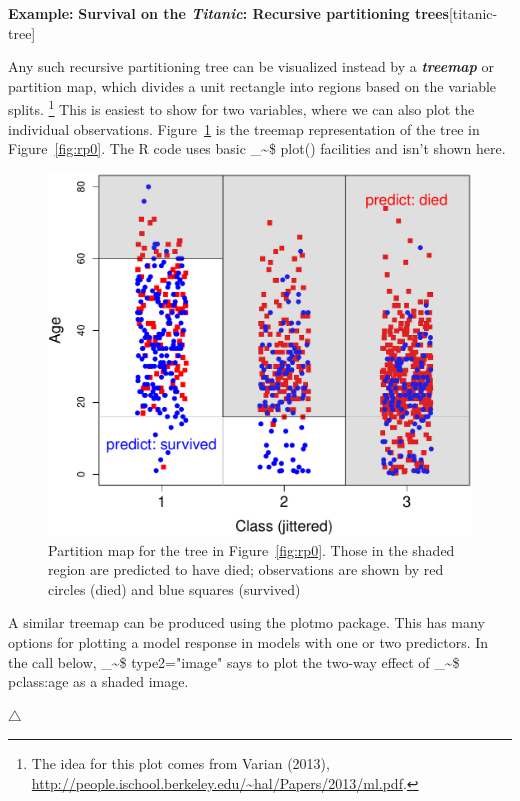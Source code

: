 \documentclass{article}
\makeatletter
\newenvironment{knitrout}{}{} %
\newcommand{\figref}[1]{Figure~\ref{#1}}
\newcommand\code{\bgroup\@makeother\_\@makeother\~\@makeother\$\@codex}
\def\@codex#1{{\normalfont\ttfamily\hyphenchar\font=-1 #1}\egroup}
\newcommand{\func}[1]{\code{#1()}}
\let\proglang=\textsf
\newcommand{\R}{\proglang{R}\xspace}
\newcommand{\pkg}[1]{\textsf{#1}\nocite{R-#1}}
\newcommand{\Rpackage}[1]{\pkg{#1} package}
\newcommand{\glossterm}[1]{\textit{\textbf{#1}}}
\newenvironment{Example}[2][unnamed-example]%
  {\medskip\noindent\textbf{\textsf{Example:}}
   \textbf{#2}\hfill [#1]\par\smallskip
  }
  {\hfill $\triangle$}
\makeatother
\begin{document}
\begin{Example}[titanic-tree]{Survival on the \emph{Titanic}: Recursive partitioning trees}
Any such recursive partitioning tree can be visualized instead by a
\glossterm{treemap} or partition map, which divides a unit rectangle
into regions based on the variable splits.%
\footnote{
The idea for this plot comes from Varian (2013),
\url{http://people.ischool.berkeley.edu/~hal/Papers/2013/ml.pdf}.
}
This is easiest to show
for two variables, where we can also plot the individual observations.
\figref{fig:partition-map1} is the treemap representation of the
tree in \figref{fig:rp0}.  The \R code uses basic \func{plot} facilities
and isn't shown here.

\begin{knitrout}
\color{fgcolor}\begin{figure}[hbt!]

{\centering \includegraphics[width=0.7\linewidth]{figure/partition-map1-1} 

}

\caption[]{Partition map for the tree in \figref{fig:rp0}.  Those in the shaded region are predicted to have died; observations are shown by red circles (died) and blue squares (survived)}\label{fig:partition-map1}
\end{figure}


\end{knitrout}

A similar treemap can be produced using the \Rpackage{plotmo}.  This has many
options for plotting a model response in models with one or two predictors.
In the call below, \code{type2="image"} says to plot the two-way effect
of \code{pclass:age} as a shaded image.


\end{Example}
\end{document}

